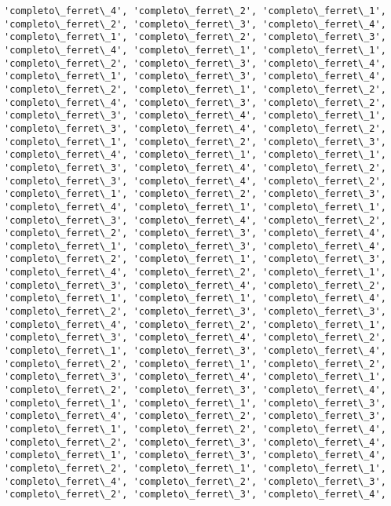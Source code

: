 \documentclass[11pt]{article}
\begin{document}
\begin{Verbatim}[commandchars=\\\{\}]
'completo\_ferret\_4', 'completo\_ferret\_2', 'completo\_ferret\_1',
'completo\_ferret\_2', 'completo\_ferret\_3', 'completo\_ferret\_4',
'completo\_ferret\_1', 'completo\_ferret\_2', 'completo\_ferret\_3',
'completo\_ferret\_4', 'completo\_ferret\_1', 'completo\_ferret\_1',
'completo\_ferret\_2', 'completo\_ferret\_3', 'completo\_ferret\_4',
'completo\_ferret\_1', 'completo\_ferret\_3', 'completo\_ferret\_4',
'completo\_ferret\_2', 'completo\_ferret\_1', 'completo\_ferret\_2',
'completo\_ferret\_4', 'completo\_ferret\_3', 'completo\_ferret\_2',
'completo\_ferret\_3', 'completo\_ferret\_4', 'completo\_ferret\_1',
'completo\_ferret\_3', 'completo\_ferret\_4', 'completo\_ferret\_2',
'completo\_ferret\_1', 'completo\_ferret\_2', 'completo\_ferret\_3',
'completo\_ferret\_4', 'completo\_ferret\_1', 'completo\_ferret\_1',
'completo\_ferret\_3', 'completo\_ferret\_4', 'completo\_ferret\_2',
'completo\_ferret\_3', 'completo\_ferret\_4', 'completo\_ferret\_2',
'completo\_ferret\_1', 'completo\_ferret\_2', 'completo\_ferret\_3',
'completo\_ferret\_4', 'completo\_ferret\_1', 'completo\_ferret\_1',
'completo\_ferret\_3', 'completo\_ferret\_4', 'completo\_ferret\_2',
'completo\_ferret\_2', 'completo\_ferret\_3', 'completo\_ferret\_4',
'completo\_ferret\_1', 'completo\_ferret\_3', 'completo\_ferret\_4',
'completo\_ferret\_2', 'completo\_ferret\_1', 'completo\_ferret\_3',
'completo\_ferret\_4', 'completo\_ferret\_2', 'completo\_ferret\_1',
'completo\_ferret\_3', 'completo\_ferret\_4', 'completo\_ferret\_2',
'completo\_ferret\_1', 'completo\_ferret\_1', 'completo\_ferret\_4',
'completo\_ferret\_2', 'completo\_ferret\_3', 'completo\_ferret\_3',
'completo\_ferret\_4', 'completo\_ferret\_2', 'completo\_ferret\_1',
'completo\_ferret\_3', 'completo\_ferret\_4', 'completo\_ferret\_2',
'completo\_ferret\_1', 'completo\_ferret\_3', 'completo\_ferret\_4',
'completo\_ferret\_2', 'completo\_ferret\_1', 'completo\_ferret\_2',
'completo\_ferret\_3', 'completo\_ferret\_4', 'completo\_ferret\_1',
'completo\_ferret\_2', 'completo\_ferret\_3', 'completo\_ferret\_4',
'completo\_ferret\_1', 'completo\_ferret\_1', 'completo\_ferret\_3',
'completo\_ferret\_4', 'completo\_ferret\_2', 'completo\_ferret\_3',
'completo\_ferret\_1', 'completo\_ferret\_2', 'completo\_ferret\_4',
'completo\_ferret\_2', 'completo\_ferret\_3', 'completo\_ferret\_4',
'completo\_ferret\_1', 'completo\_ferret\_3', 'completo\_ferret\_4',
'completo\_ferret\_2', 'completo\_ferret\_1', 'completo\_ferret\_1',
'completo\_ferret\_4', 'completo\_ferret\_2', 'completo\_ferret\_3',
'completo\_ferret\_2', 'completo\_ferret\_3', 'completo\_ferret\_4',

\end{Verbatim}
\end{document}
